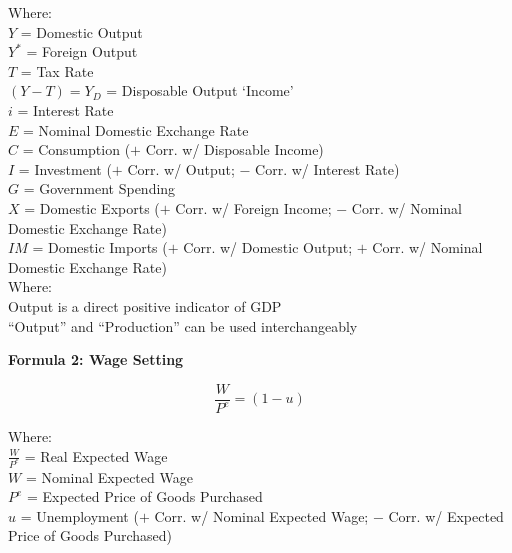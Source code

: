 \documentclass[11pt, english]{article}
\begin{document}
	Where:\\
	$Y$ = Domestic Output\\
	$Y^*$ = Foreign Output\\
	$T$ = Tax Rate\\
	$(Y-T)=Y_D$ = Disposable Output `Income'\\
	$i$ = Interest Rate\\
	$E$ = Nominal Domestic Exchange Rate\\
	$C$ = Consumption ($+$ Corr. w/ Disposable Income)\\
	$I$ = Investment ($+$ Corr. w/ Output; $-$ Corr. w/ Interest Rate)\\
	$G$ = Government Spending\\
	$X$ = Domestic Exports ($+$ Corr. w/ Foreign Income; $-$ Corr. w/ Nominal Domestic Exchange Rate)\\
	$IM$ = Domestic Imports ($+$ Corr. w/ Domestic Output; $+$ Corr. w/ Nominal Domestic Exchange Rate)\\

	Where:\\
	Output is a direct positive indicator of GDP\\
	``Output'' and ``Production'' can be used interchangeably\\

	\newpage

	\textbf{Formula 2: Wage Setting}

	$$\frac{W}{P^e}=(1-u)$$

	Where:\\
	$\frac{W}{P^e}$ = Real Expected Wage\\
	$W$ = Nominal Expected Wage\\
	$P^e$ = Expected Price of Goods Purchased\\
	$u$ = Unemployment ($+$ Corr. w/ Nominal Expected Wage; $-$ Corr. w/ Expected Price of Goods Purchased)

\newpage

	\renewcommand\refname{Bibliography}
\end{document}
